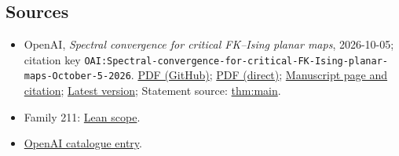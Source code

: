 \documentclass[11pt]{article}
\begin{document}
\subsection{Sources}
\begin{itemize}
\item OpenAI, \emph{Spectral convergence for critical FK–Ising planar maps}, 2026-10-05; citation key \texttt{OAI:Spectral-convergence-for-critical-FK-Ising-planar-maps-October-5-2026}. \href{https://github.com/openai/math/blob/adc7f1241b42e322a6451854ab7e4b4c146bf78a/preprints/Spectral-convergence-for-critical-FK-Ising-planar-maps-October-5-2026/spectral-convergence-critical-fk-ising-planar-maps.pdf}{PDF (GitHub)}; \href{https://github.com/openai/math/raw/adc7f1241b42e322a6451854ab7e4b4c146bf78a/preprints/Spectral-convergence-for-critical-FK-Ising-planar-maps-October-5-2026/spectral-convergence-critical-fk-ising-planar-maps.pdf}{PDF (direct)}; \href{https://github.com/openai/math/blob/adc7f1241b42e322a6451854ab7e4b4c146bf78a/preprints/Spectral-convergence-for-critical-FK-Ising-planar-maps-October-5-2026/README.md}{Manuscript page and citation}; \href{https://github.com/openai/math/blob/main/preprints/Spectral-convergence-for-critical-FK-Ising-planar-maps-October-5-2026/spectral-convergence-critical-fk-ising-planar-maps.pdf}{Latest version}; Statement source: \href{https://github.com/openai/math/blob/adc7f1241b42e322a6451854ab7e4b4c146bf78a/preprints/Spectral-convergence-for-critical-FK-Ising-planar-maps-October-5-2026/build/tex/01-introduction.tex\#L177}{thm:main}.
\item Family 211: \href{https://github.com/openai/math/blob/adc7f1241b42e322a6451854ab7e4b4c146bf78a/lean/docs/211.md}{Lean scope}.
\item \href{https://github.com/openai/math/blob/adc7f1241b42e322a6451854ab7e4b4c146bf78a/CONTENTS.md}{OpenAI catalogue entry}.
\end{itemize}
\end{document}
